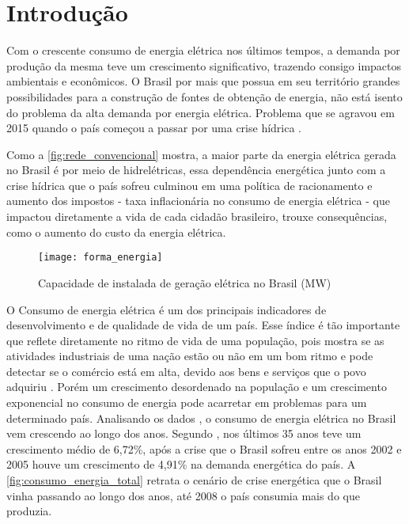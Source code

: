 \chapter[Introdução]{Introdução}
\label{ch:introdução}
Com o crescente consumo de energia elétrica nos últimos tempos, a demanda por produção da mesma teve um crescimento significativo, trazendo consigo 
impactos ambientais e econômicos. O Brasil por mais que possua em seu território grandes possibilidades para a construção de fontes de obtenção de energia, não
está isento do problema da alta demanda por energia elétrica. Problema que se agravou em 2015 quando o país começou a passar por
uma crise hídrica \cite{crise-hidrica-2015}.

Como a \autoref{fig:rede_convencional} mostra, a maior parte da energia elétrica gerada no Brasil é por meio de hidrelétricas, essa dependência
energética junto com a crise hídrica que o país sofreu culminou em uma política de racionamento e aumento dos impostos - taxa inflacionária no
consumo de energia elétrica - que impactou diretamente a vida de cada cidadão brasileiro, trouxe consequências, como o aumento do 
custo da energia elétrica.




\begin{figure}[h!]
	\texttt{[image: forma\_energia]}
	\centering
	\caption[Capacidade de instalada de geração elétrica no Brasil (MW)]{Capacidade de instalada de geração elétrica no Brasil (MW)}
	\label{fig:rede_convencional}
\end{figure}
\FloatBarrier


O Consumo de energia elétrica é um dos principais indicadores de desenvolvimento e de qualidade de vida 
de um país. Esse índice é tão importante que reflete diretamente no ritmo de vida de uma população, pois mostra
se as atividades industriais de uma nação estão ou não em um bom ritmo e pode detectar se o comércio está em alta,
devido aos bens e serviços que o povo adquiriu \cite{energia-desenvolvimento}. Porém um crescimento desordenado na população e um crescimento
exponencial no consumo de energia pode acarretar em problemas para um determinado país.
Analisando os dados \cite{epe-balanco-final}, o consumo de energia  
elétrica no Brasil vem crescendo ao longo dos anos. Segundo \cite{ref-jc}, nos últimos 35 anos teve um crescimento médio de 6,72\%, após a crise que o Brasil sofreu entre os anos 2002 e 2005 houve um crescimento
de 4,91\% na demanda energética do país. A \autoref{fig:consumo_energia_total} retrata o cenário de crise energética que o Brasil vinha
passando ao longo dos anos, até 2008 o país consumia mais do que produzia.

